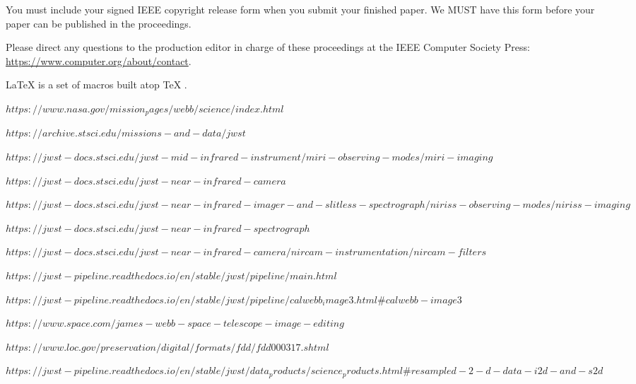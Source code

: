\documentclass[10pt,twocolumn,letterpaper]{article}
\begin{document}
You must include your signed IEEE copyright release form when you submit your finished paper.
We MUST have this form before your paper can be published in the proceedings.

Please direct any questions to the production editor in charge of these proceedings at the IEEE Computer Society Press:
\url{https://www.computer.org/about/contact}.

\LaTeX{} \cite{lamport94} is a set of macros built atop \TeX{} \cite{texbook}.
\begin{thebibliography}{9}
$https://www.nasa.gov/mission_pages/webb/science/index.html$

$https://archive.stsci.edu/missions-and-data/jwst$

$https://jwst-docs.stsci.edu/jwst-mid-infrared-instrument/miri-observing-modes/miri-imaging$

$https://jwst-docs.stsci.edu/jwst-near-infrared-camera$

$https://jwst-docs.stsci.edu/jwst-near-infrared-imager-and-slitless-spectrograph/niriss-observing-modes/niriss-imaging$

$https://jwst-docs.stsci.edu/jwst-near-infrared-spectrograph$

$https://jwst-docs.stsci.edu/jwst-near-infrared-camera/nircam-instrumentation/nircam-filters$

$https://jwst-pipeline.readthedocs.io/en/stable/jwst/pipeline/main.html$

$https://jwst-pipeline.readthedocs.io/en/stable/jwst/pipeline/calwebb_image3.html\#calwebb-image3$

$https://www.space.com/james-webb-space-telescope-image-editing$

$https://www.loc.gov/preservation/digital/formats/fdd/fdd000317.shtml$

$https://jwst-pipeline.readthedocs.io/en/stable/jwst/data_products/science_products.html\#resampled-2-d-data-i2d-and-s2d$
\end{thebibliography}
\end{document}
